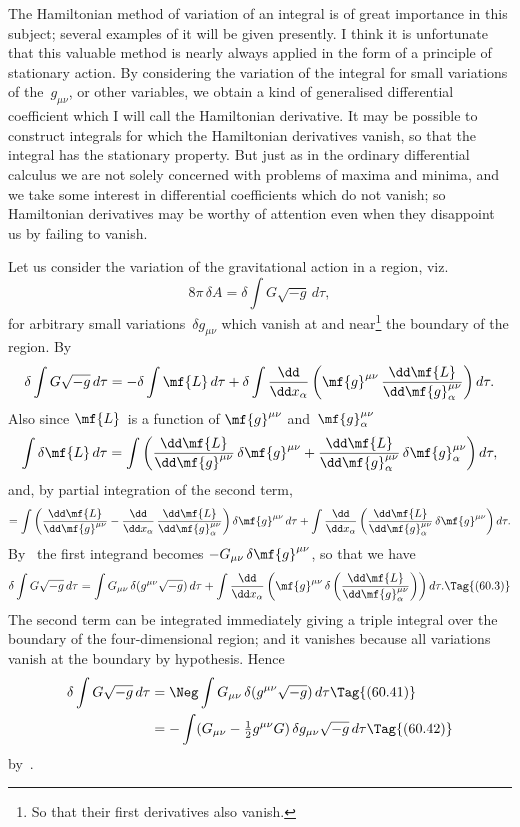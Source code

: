 \documentclass[12pt]{book}
\begin{document}
The Hamiltonian method of variation of an integral is of great importance
in this subject; several examples of it will be given presently. I think it is
unfortunate that this valuable method is nearly always applied in the form of
a principle of stationary action. By considering the variation of the integral
for small variations of the~$g_{\mu\nu}$, or other variables, we obtain a kind of generalised
differential coefficient which I will call the Hamiltonian derivative. It
may be possible to construct integrals for which the Hamiltonian derivatives
vanish, so that the integral has the stationary property. But just as in the
ordinary differential calculus we are not solely concerned with problems of
maxima and minima, and we take some interest in differential coefficients
which do not vanish; so Hamiltonian derivatives may be worthy of attention
even when they disappoint us by failing to vanish.

Let us consider the variation of the gravitational action in a region, viz.\
\[
8\pi\, \delta A = \delta \int G\sqrt{-g}\, d\tau,
\]
for arbitrary small variations~$\delta g_{\mu\nu}$ which vanish at and near\footnote
  {So that their first derivatives also vanish.}
the boundary of
the region. By~
\[
\delta \int G\sqrt{-g}\, d\tau
= -\delta \int \mf{L}\, d\tau
+ \delta \int \frac{\dd}{\dd x_{\alpha}} \left(\mf{g}^{\mu\nu}\, \frac{\dd\mf{L}}{\dd\mf{g}_{\alpha}^{\mu\nu}}\right) d\tau.
\]
Also since $\mf{L}$~is a function of $\mf{g}^{\mu\nu}$ and~$\mf{g}_{\alpha}^{\mu\nu}$
\[
\int \delta\mf{L}\, d\tau
  = \int \left(
  \frac{\dd\mf{L}}{\dd\mf{g}^{\mu\nu}}\, \delta\mf{g}^{\mu\nu}
+ \frac{\dd\mf{L}}{\dd\mf{g}_{\alpha}^{\mu\nu}}\, \delta\mf{g}_{\alpha}^{\mu\nu}
\right) d\tau,
\]
and, by partial integration of the second term,
\[
= \int \left(
\frac{\dd\mf{L}}{\dd\mf{g}^{\mu\nu}}
- \frac{\dd}{\dd x_{\alpha}}\, \frac{\dd\mf{L}}{\dd\mf{g}_{\alpha}^{\mu\nu}}\right) \delta\mf{g}^{\mu\nu}\, d\tau
+ \int \frac{\dd}{\dd x_{\alpha}} \left(\frac{\dd\mf{L}}{\dd\mf{g}_{\alpha}^{\mu\nu}}\, \delta\mf{g}^{\mu\nu}\right) d\tau.
\]
By~ the first integrand becomes $-G_{\mu\nu}\, \delta\mf{g}^{\mu\nu}$, so that we have
\[
\delta \int G\sqrt{-g}\, d\tau
= \int G_{\mu\nu}\, \delta(g^{\mu\nu} \sqrt{-g})\, d\tau
+ \int \frac{\dd}{\dd x_{\alpha}} \left(\mf{g}^{\mu\nu}\, \delta\left(\frac{\dd\mf{L}}{\dd\mf{g}_{\alpha}^{\mu\nu}}\right)\right) d\tau.
\Tag{(60.3)}
\]
The second term can be integrated immediately giving a triple integral over
the boundary of the four\hyp{}dimensional region; and it vanishes because all
variations vanish at the boundary by hypothesis. Hence
\begin{align*}
  \delta \int G\sqrt{-g}\, d\tau
  &= \Neg \int G_{\mu\nu}\, \delta(g^{\mu\nu} \sqrt{-g})\, d\tau
  \Tag{(60.41)} \\
  &= -\int (G_{\mu\nu} - \tfrac{1}{2}g^{\mu\nu}G)\, \delta g_{\mu\nu} \sqrt{-g}\, d\tau
\Tag{(60.42)}
\end{align*}
by~.
\end{document}
